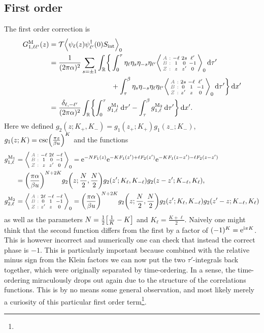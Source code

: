 \documentclass[english, parskip=full]{scrartcl}
\begin{document}
\subsection{First order}
The first order correction is
\begin{align}
G_{1,\ell\ell'}^\M(z) &= \mathcal{T} \bra*{\psi_\ell (z) \psi_{\ell'}^\dagger(0) S_\Text{int}}_0 \\
&= \bsplit{\frac{1}{(2\pi\alpha)^2} \sum_{s=\pm 1}\intr{ \klc[\bigg]{&\intx{0}{\tau}{ \eta_\ell \eta_s\eta_{-s} \eta_{\ell'}  \bra*{\zabx{-\ell & 2s & \ell'}{1 & 0 & -1}{z & z' & 0}}_0 }{\tau'} \\
&+ \intx{\tau}{\beta}{ \eta_s\eta_{-s} \eta_\ell \eta_{\ell'}  \bra*{\zabx{2s & -\ell & \ell'}{0 & 1 & -1}{z' & z & 0}}_0 }{\tau'}} }{x'}} \\
&= \frac{\delta_{\ell,-\ell'}}{(2\pi\alpha)^2} \intr{\klc[\bigg]{\intx{0}{\tau}{ g_{1,\ell}^{\M_1} }{\tau'} - \intx{\tau}{\beta}{ g_{1,\ell}^{\M_2} }{\tau'}} }{x'}.
\end{align}
Here we defined $g_2(z;K_+,K_-) = g_1(z_+;K_+) g_1(z_-;K_-)$, $g_1(z;K) = \csc\kla*{\frac{\pi z}{\beta u}}^{K}$ and the functions
\begin{align}
g_{1,\ell}^{\M_1} &= \bra*{\zabx{-\ell&2\ell&-\ell}{1&0&-1}{z&z'&0}}_0 = \powe{-NF_1(z)} \powe{-KF_1(z') + \ell F_2(z')} \powe{-KF_1(z-z') - \ell F_2(z-z')}\\
&= \kla*{\frac{\pi\alpha}{\beta u}}^{N+2K} g_2\kla*{z; \frac{N}{2}, \frac{N}{2}} g_2\kla*{z'; K_{\ell}, K_{-\ell}} g_2\kla*{z-z'; K_{-\ell}, K_{\ell}},\\
g_{2,\ell}^{\M_2} &= \bra*{\zabx{2\ell&-\ell&-\ell}{0&1&-1}{z'&z&0}}_0 = \kla*{\frac{\pi\alpha}{\beta u}}^{N+2K} g_2\kla*{z; \frac{N}{2}, \frac{N}{2}} g_2\kla*{z'; K_{\ell}, K_{-\ell}} g_2\kla*{z'-z; K_{-\ell}, K_{\ell}}
\end{align}
as well as the parameters $N=\frac{1}{2} \klb*{\frac{1}{K} - K}$ and $K_{\ell} = \frac{K + \ell}{2}$.
Naively one might think that the second function differs from the first by a factor of $(-1)^K = \text{e}^{\text{i}\pi K}$.
This is however incorrect and numerically one can check that instead the correct phase is $-1$.
This is particularly important because combined with the relative minus sign from the Klein factors we can now put the two $\tau'$-integrals back together, which were originally separated by time-ordering.
In a sense, the time-ordering miraculously drops out again due to the structure of the correlations functions.
This is by no means some general observation, and most likely merely a curiosity of this particular first order term\footnote{}.\\
\end{document}
